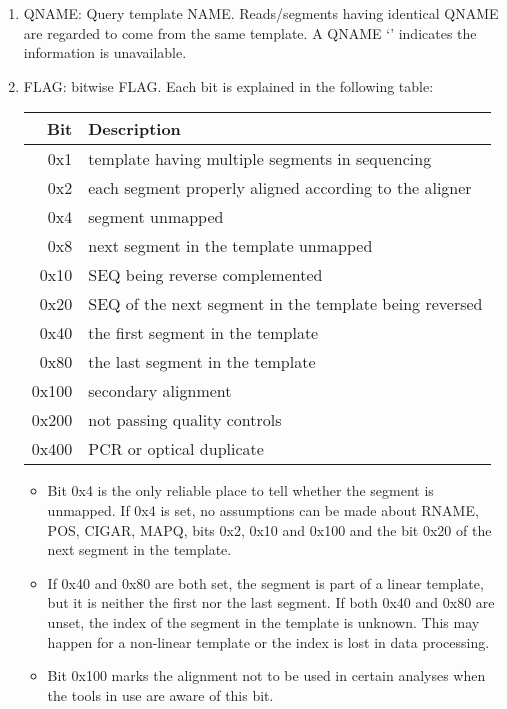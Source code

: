 \documentclass[10pt]{article}
\begin{document}
\begin{enumerate}
\item {\sf QNAME}: Query template NAME. Reads/segments having identical {\sf QNAME}
	are regarded to come from the same template. A {\sf QNAME} `{\tt *}' indicates the information is unavailable.
\item {\sf FLAG}: bitwise FLAG. Each bit is explained in the following
  table:
  \begin{center}\small
  \begin{tabular}{rl}
  \hline
  Bit & Description\\
  \hline
  0x1 &  template having multiple segments in sequencing \\
  0x2 &  each segment properly aligned according to the aligner \\
  0x4 &  segment unmapped \\
  0x8 &  next segment in the template unmapped \\
  0x10 &  {\sf SEQ} being reverse complemented \\
  0x20 &  {\sf SEQ} of the next segment in the template being reversed \\
  0x40 &  the first segment in the template \\
  0x80 &  the last segment in the template \\
  0x100 &  secondary alignment\\
  0x200 &  not passing quality controls \\
  0x400 &  PCR or optical duplicate \\
  \hline
  \end{tabular}
  \end{center}
  \begin{itemize}
  \item Bit 0x4 is the only reliable place to tell whether the segment
    is unmapped. If 0x4 is set, no assumptions can be made about {\sf
      RNAME}, {\sf POS}, {\sf CIGAR}, {\sf MAPQ}, bits 0x2, 0x10 and
    0x100 and the bit 0x20 of the next segment in the template.
  \item If 0x40 and 0x80 are both set, the segment is part of a linear
    template, but it is neither the first nor the last segment. If both
    0x40 and 0x80 are unset, the index of the segment in the template
    is unknown. This may happen for a non-linear template or the index
    is lost in data processing.
  \item Bit 0x100 marks the alignment not to be used in certain analyses
    when the tools in use are aware of this bit.

\end{itemize}
\end{enumerate}
\end{document}
